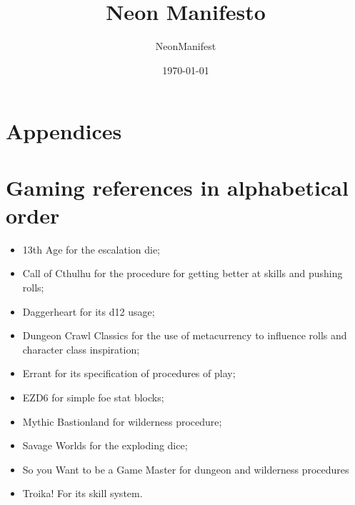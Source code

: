 \documentclass{article}
\title{Neon Manifesto}
\author{NeonManifest}
\date{\today}
\begin{document}
\maketitle

\tableofcontents









\appendix
\section*{Appendices}
\section{Gaming references in alphabetical order}
\begin{itemize}
    \item {13th Age for the escalation die;}
    \item {Call of Cthulhu for the procedure for getting better at skills and pushing rolls;}
    \item {Daggerheart for its d12 usage;}
    \item {Dungeon Crawl Classics for the use of metacurrency to influence rolls and character class inspiration;}
    \item {Errant for its specification of procedures of play;}
    \item {EZD6 for simple foe stat blocks;}
    \item {Mythic Bastionland for wilderness procedure;}
    \item {Savage Worlds for the exploding dice;}
    \item {So you Want to be a Game Master for dungeon and wilderness procedures}
    \item {Troika! For its skill system.}
\end{itemize}
\end{document}
